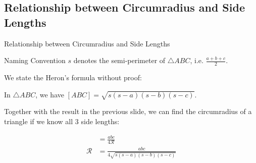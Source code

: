 \documentclass{beamer}
\begin{document}
\subsection{Relationship between Circumradius and Side Lengths}
\begin{frame}{Relationship between Circumradius and Side Lengths}
	\begin{exampleblock}{Naming Convention}
		$s$ denotes the semi-perimeter of $\triangle ABC$, i.e. $\frac{a+b+c}{2}$.
	\end{exampleblock}
	We state the Heron's formula without proof:
	\begin{theorem}
		In $\triangle ABC$, we have $[ABC] = \sqrt{s(s-a)(s-b)(s-c)}$.
	\end{theorem}
	Together with the result in the previous slide, we can find the circumradius of a triangle if we know all $3$ side lengths:
	\begin{theorem}
		\begin{align*}
			[ABC] &= \tfrac{abc}{4\mathcal{R}} \\
			\mathcal{R} &= \tfrac{abc}{4\sqrt{s(s-a)(s-b)(s-c)} }
		\end{align*}
	\end{theorem}
\end{frame}
\end{document}

